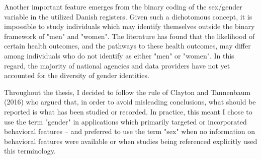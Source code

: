 Another important feature emerges from the binary coding of the 
sex/gender variable in the utilized Danish registers. Given such 
a dichotomous concept, it is impossible to study individuals which 
may identify themselves outside the binary framework of "men" and 
"women". The literature has found that the likelihood of certain 
health outcomes, and the pathways to these health outcomes, may differ 
among individuals who do not identify as either "men" or "women".\citep{richards2016non,
koehler2018genders,rider2018health} In this regard, the majority of 
national agencies and data providers have not yet accounted for the 
diversity of gender identities.

Throughout the thesis, I decided to follow the rule of Clayton and 
Tannenbaum (2016) who argued that, in order to avoid misleading conclusions, 
what should be reported is what has been studied or recorded.\citep{clayton2016reporting} 
In practice, this meant I chose to use the term "gender" in applications 
which primarily targeted or incorporated behavioral features -- and 
preferred to use the term "sex" when no information on behavioral 
features were available or when studies being referenced explicitly 
used this terminology.

